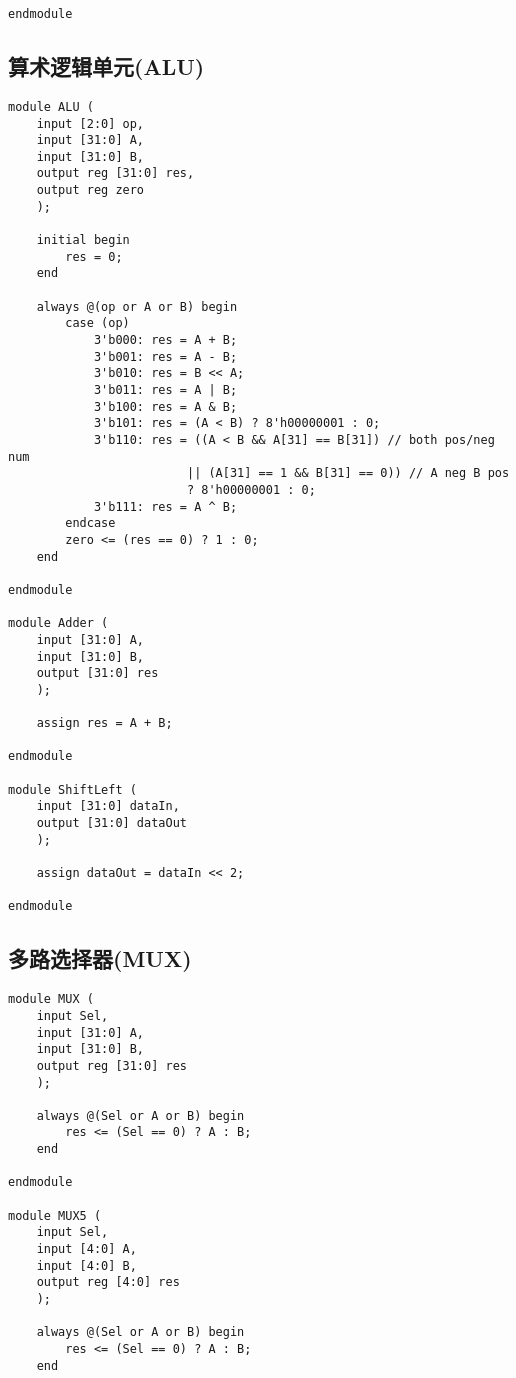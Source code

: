 \begin{multicols}{2}
\begin{lstlisting}
endmodule
\end{lstlisting}

\subsection{算术逻辑单元(ALU)}
\begin{lstlisting}
module ALU (
    input [2:0] op,
    input [31:0] A,
    input [31:0] B,
    output reg [31:0] res,
    output reg zero
    );
    
    initial begin
        res = 0;
    end
    
    always @(op or A or B) begin
        case (op)
            3'b000: res = A + B;
            3'b001: res = A - B;
            3'b010: res = B << A;
            3'b011: res = A | B;
            3'b100: res = A & B;
            3'b101: res = (A < B) ? 8'h00000001 : 0;
            3'b110: res = ((A < B && A[31] == B[31]) // both pos/neg num
                         || (A[31] == 1 && B[31] == 0)) // A neg B pos
                         ? 8'h00000001 : 0;
            3'b111: res = A ^ B;
        endcase
        zero <= (res == 0) ? 1 : 0;
    end

endmodule

module Adder (
    input [31:0] A,
    input [31:0] B,
    output [31:0] res
    );

    assign res = A + B;

endmodule

module ShiftLeft (
    input [31:0] dataIn,
    output [31:0] dataOut
    );
    
    assign dataOut = dataIn << 2;

endmodule
\end{lstlisting}

\subsection{多路选择器(MUX)}
\begin{lstlisting}
module MUX (
    input Sel,
    input [31:0] A,
    input [31:0] B,
    output reg [31:0] res
    );
    
    always @(Sel or A or B) begin
        res <= (Sel == 0) ? A : B;
    end

endmodule

module MUX5 (
    input Sel,
    input [4:0] A,
    input [4:0] B,
    output reg [4:0] res
    );
    
    always @(Sel or A or B) begin
        res <= (Sel == 0) ? A : B;
    end


\end{lstlisting}
\end{multicols}
